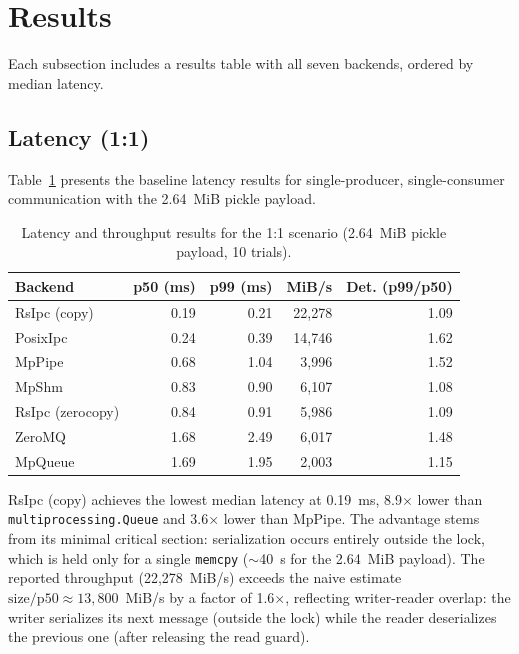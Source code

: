 \newpage
\section{Results}
\label{sec:bench_results}

Each subsection includes a results table with all seven backends, ordered by median latency.

\subsection{Latency (1:1)}
\label{subsec:latency_results}

Table~\ref{tab:latency_11} presents the baseline latency results for single-producer, single-consumer communication with the 2.64~MiB pickle payload.

\begin{table}[htbp]
    \centering
    \caption{Latency and throughput results for the 1:1 scenario (2.64~MiB pickle payload, 10 trials).}
    \label{tab:latency_11}
    \begin{tabular}{lrrrr}
        \hline
        \textbf{Backend} & \textbf{p50 (ms)} & \textbf{p99 (ms)} & \textbf{MiB/s} & \textbf{Det. (p99/p50)} \\
        \hline
        RsIpc (copy) & 0.19 & 0.21 & 22,278 & 1.09 \\
        PosixIpc & 0.24 & 0.39 & 14,746 & 1.62 \\
        MpPipe & 0.68 & 1.04 & 3,996 & 1.52 \\
        MpShm & 0.83 & 0.90 & 6,107 & 1.08 \\
        RsIpc (zerocopy) & 0.84 & 0.91 & 5,986 & 1.09 \\
        ZeroMQ & 1.68 & 2.49 & 6,017 & 1.48 \\
        MpQueue & 1.69 & 1.95 & 2,003 & 1.15 \\
        \hline
    \end{tabular}
\end{table}

RsIpc (copy) achieves the lowest median latency at 0.19~ms, 8.9$\times$ lower than \texttt{multiprocessing.Queue} and 3.6$\times$ lower than MpPipe. The advantage stems from its minimal critical section: serialization occurs entirely outside the lock, which is held only for a single \texttt{memcpy} ($\sim$40~\textmu s for the 2.64~MiB payload). The reported throughput (22{,}278~MiB/s) exceeds the naive estimate $\text{size}/\text{p50} \approx 13{,}800$~MiB/s by a factor of 1.6$\times$, reflecting writer-reader overlap: the writer serializes its next message (outside the lock) while the reader deserializes the previous one (after releasing the read guard).

